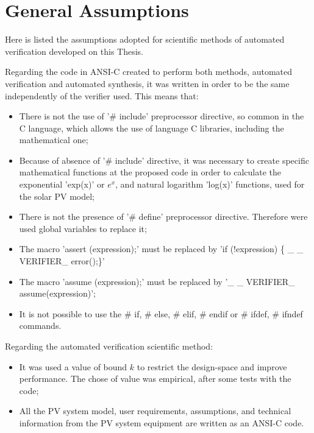 %

\section{General Assumptions}
\label{sec:assumptions}

Here is listed the assumptions adopted for scientific methods of automated verification developed on this Thesis.

Regarding the code in ANSI-C created to perform both methods, automated verification and automated synthesis, it was written in order to be the same independently of the verifier used. This means that: 

\begin{itemize}
\item There is not the use of '\# include' preprocessor directive, so common in the C language, which allows the use of language C libraries, including the mathematical one;
\item Because of absence of '\# include' directive, it was necessary to create specific mathematical functions at the proposed code in order to calculate the exponential 'exp(x)' or $e^{x}$, and natural logarithm 'log(x)' functions, used for the solar PV model;
\item There is not the presence of '\# define' preprocessor directive. Therefore were used global variables to replace it;
\item The macro 'assert (expression);' must be replaced by 'if (!expression) \{ \_ \_ VERIFIER\_ error();\}'
\item The macro 'assume (expression);' must be replaced by '\_ \_ VERIFIER\_ assume(expression)';
\item It is not possible to use the \# if, \# else, \# elif, \# endif or \# ifdef, \# ifndef commands.
\end{itemize}

Regarding the automated verification scientific method:

\begin{itemize}
\item It was used a value of bound $k$ to restrict the design-space and improve performance. The chose of value was empirical, after some tests with the code;
\item All the PV system model, user requirements, assumptions, and technical information from the PV system equipment are written as an ANSI-C code.
\end{itemize}

